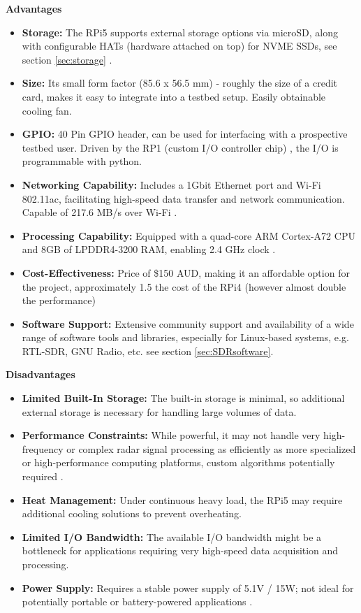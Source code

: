 \noindent \textbf{Advantages}
\begin{itemize}
    \item \textbf{Storage:} The RPi5 supports external storage options via microSD, along with configurable HATs (hardware attached on top) for NVME SSDs, see section \ref{sec:storage} \cite{pimoroni_nvme_base}.
    \item \textbf{Size:} Its small form factor (85.6 x 56.5 mm) - roughly the size of a credit card, makes it easy to integrate into a testbed setup. Easily obtainable cooling fan.
    \item \textbf{GPIO:} 40 Pin GPIO header, can be used for interfacing with a prospective testbed user. Driven by the RP1 (custom I/O controller chip) \cite{core_electronics_rpi5}, the I/O is programmable with python.
    \item \textbf{Networking Capability:} Includes a 1Gbit Ethernet port and Wi-Fi 802.11ac, facilitating high-speed data transfer and network communication. Capable of 217.6 MB/s over Wi-Fi \cite{rpi5_wifi}.
    \item \textbf{Processing Capability:} Equipped with a quad-core ARM Cortex-A72 CPU and 8GB of LPDDR4-3200 RAM, enabling 2.4 GHz clock \cite{core_electronics_rpi5}.
    \item \textbf{Cost-Effectiveness:} Price of \$150 AUD, making it an affordable option for the project, approximately 1.5 the cost of the RPi4 (however almost double the performance) \cite{core_electronics_rpi5}
    \item \textbf{Software Support:} Extensive community support and availability of a wide range of software tools and libraries, especially for Linux-based systems, e.g. RTL-SDR, GNU Radio, etc. see section \ref{sec:SDRsoftware}.
\end{itemize}

\noindent \textbf{Disadvantages} 
\begin{itemize}
    \item \textbf{Limited Built-In Storage:} The built-in storage is minimal, so additional external storage is necessary for handling large volumes of data.
    \item \textbf{Performance Constraints:} While powerful, it may not handle very high-frequency or complex radar signal processing as efficiently as more specialized or high-performance computing platforms, custom algorithms potentially required \cite{IOTpassiveRadar}.
    \item \textbf{Heat Management:} Under continuous heavy load, the RPi5 may require additional cooling solutions to prevent overheating.
    \item \textbf{Limited I/O Bandwidth:} The available I/O bandwidth might be a bottleneck for applications requiring very high-speed data acquisition and processing.
    \item \textbf{Power Supply:} Requires a stable power supply of 5.1V / 15W; not ideal for potentially portable or battery-powered applications \cite{rpi5_wifi}. 
\end{itemize}



